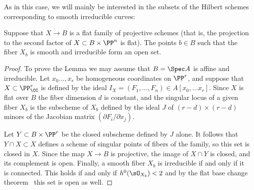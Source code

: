 As in this case, we will mainly be   interested in the subsets of the Hilbert schemes corresponding to smooth irreducible curves:

\begin{lemma}\label{smooth is open}
Suppose that $X \to B$ is a flat family of projective schemes (that is, the projection to the second factor of 
$X\subset B\times \PP^n$  is flat). The points $b\in B$ such that the fiber $X_b$ is smooth and irreducible form an open set.
\end{lemma}

\begin{proof}
To prove the Lemma we may assume that $B = \Spec A$ is affine and irreducible. Let $x_{0}\dots, x_{r}$ be homogeneous coordinates
on $\PP^{r}$, and suppose that 
$X\subset \PP^{r}_{\CC}$ is defined by the ideal $I_{X} = (F_{1}, \dots, F_{n}) \in A[x_{0}, \dots x_{r}]$.
Since $X$ is flat over $B$ the fiber dimension $d$ is constant, and the singular locus 
of a given fiber $X_{b}$ is  the subscheme of $X_{b}$ defined by the ideal $J$ of
$(r-d)\times (r-d)$ minors of the Jacobian matrix $(\partial F_{i}/\partial x_{j})$.

Let $Y\subset B\times \PP^{r}$ be the closed subscheme defined by $J$ alone. 
It follows that $Y\cap X \subset X$ defines a scheme of singular points of fibers of the family, so this set is closed
in $X$.
Since the map $X \to B$ is projective, the image of $X\cap Y$ is closed, and its complement is open.
 Finally, a smooth fiber $X_b$ is irreducible if and only if it is connected. This holds if and only if $h^0(\sO_{X_b}) <2$ and by the flat base change theorem~\cite[Theorem 12.11]{Hartshorne1977} this set is open as well.
\end{proof}




